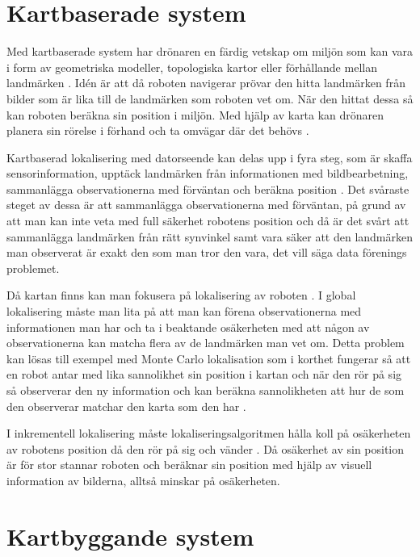 \section{Kartbaserade system}

Med kartbaserade system har drönaren en färdig vetskap om miljön som kan vara i form av geometriska modeller, topologiska kartor eller förhållande mellan landmärken \citep{982903}. Idén är att då roboten navigerar prövar den hitta landmärken från bilder som är lika till de landmärken som roboten vet om. När den hittat dessa så kan roboten beräkna sin position i miljön. Med hjälp av karta kan drönaren planera sin rörelse i förhand och ta omvägar där det behövs \citep{geospatial}. 

Kartbaserad lokalisering med datorseende kan delas upp i fyra steg, som är skaffa sensorinformation, upptäck landmärken från informationen med bildbearbetning, sammanlägga observationerna med förväntan och beräkna position \citep{982903}. Det svåraste steget av dessa är att sammanlägga observationerna med förväntan, på grund av att man kan inte veta med full säkerhet robotens position och då är det svårt att sammanlägga landmärken från rätt synvinkel samt vara säker att den landmärken man observerat är exakt den som man tror den vara, det vill säga data förenings problemet.

Då kartan finns kan man fokusera på lokalisering av roboten \citep{982903}. I global lokalisering måste man lita på att man kan förena observationerna med informationen man har och ta i beaktande osäkerheten med att någon av observationerna kan matcha flera av de landmärken man vet om. Detta problem kan lösas till exempel med Monte Carlo lokalisation som i korthet fungerar så att en robot antar med lika sannolikhet sin position i kartan och när den rör på sig så observerar den ny information och kan beräkna sannolikheten att hur de som den observerar matchar den karta som den har \citep{772544}.

I inkrementell lokalisering måste lokaliseringsalgoritmen hålla koll på osäkerheten av robotens position då den rör på sig och vänder \citep{772544}. Då osäkerhet av sin position är för stor stannar roboten och beräknar sin position med hjälp av visuell information av bilderna, alltså minskar på osäkerheten.

\section{Kartbyggande system}


